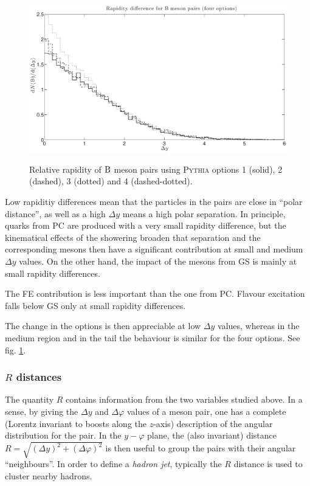 \documentclass[a4paper,12pt]{article}
\begin{document}
\begin{figure}[!h]
\centering
\caption[$\B$ meson pairs relative rapidity. Four \textsc{Pythia} options.]{Relative rapidity of $\B$ meson pairs using \textsc{Pythia} options 1 (solid), 2 (dashed), 3 (dotted) and 4 (dashed-dotted).}
\includegraphics[width=15cm]{BBY4Op.eps}
\label{fig:BBY4Op}
\end{figure}

Low rapiditiy differences mean that the particles in the pairs are close in ``polar distance'', as well as a high $\Delta y$ means a high polar separation. In principle, quarks from PC are produced with a very small rapidity difference, but the kinematical effects of the showering broaden that separation and the corresponding mesons then have a significant contribution at small and medium $\Delta y$ values. On the other hand, the impact of the mesons from GS is mainly at small rapidity differences.

The FE contribution is less important than the one from PC. Flavour excitation falls below GS only at small rapidity differences.

The change in the options is then appreciable at low $\Delta y$ values, whereas in the medium region and in the tail the behaviour is similar for the four options. See fig. \ref{fig:BBY4Op}.

\subsubsection{$R$ distances}

The quantity $R$ contains information from the two variables studied above. In a sense, by giving the $\Delta y$ and $\Delta \varphi$ values of a meson pair, one has a complete (Lorentz invariant to boosts along the $z$-axis) description of the angular distribution for the pair. In the $y - \varphi$ plane, the (also invariant) distance $R=\sqrt{(\Delta y)^2 + (\Delta \varphi)^2}$ is then useful to group the pairs with their angular ``neighbours''. In order to define a \textit{hadron jet}, typically the $R$ distance is used to cluster nearby hadrons.
\end{document}
